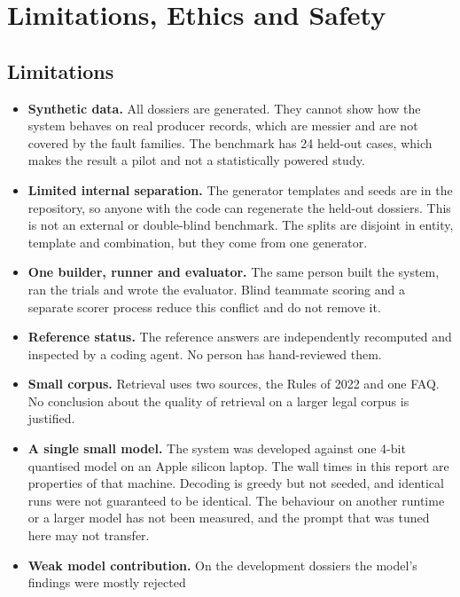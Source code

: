 \chapter{Limitations, Ethics and Safety}
\label{ch:limits}

\section{Limitations}
\begin{itemize}[itemsep=3pt]
\item \textbf{Synthetic data.} All dossiers are generated. They cannot show how the system behaves on real
      producer records, which are messier and are not covered by the fault families. The benchmark has 24
      held-out cases, which makes the result a pilot and not a statistically powered study.
\item \textbf{Limited internal separation.} The generator templates and seeds are in the repository, so anyone
      with the code can regenerate the held-out dossiers. This is not an external or double-blind benchmark. The
      splits are disjoint in entity, template and combination, but they come from one generator.
\item \textbf{One builder, runner and evaluator.} The same person built the system, ran the trials and
      wrote the evaluator. Blind teammate scoring and a separate scorer process reduce this conflict and do not remove it.
\item \textbf{Reference status.} The reference answers are independently recomputed and inspected by a coding agent.
      No person has hand-reviewed them.
\item \textbf{Small corpus.} Retrieval uses two sources, the Rules of 2022 and one FAQ. No conclusion about the
      quality of retrieval on a larger legal corpus is justified.
\item \textbf{A single small model.} The system was developed against one 4-bit quantised model on an Apple
      silicon laptop. The wall times in this report are properties of that machine. Decoding is greedy but
      not seeded, and identical runs were not guaranteed to be identical. The behaviour on another runtime or a
      larger model has not been measured, and the prompt that was tuned here may not transfer.
\item \textbf{Weak model contribution.} On the development dossiers the model's findings were mostly rejected

\end{itemize}
